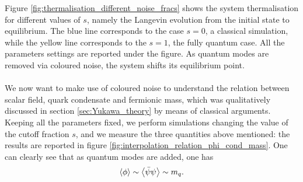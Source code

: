 Figure \ref{fig:thermalisation_different_noise_fracs} shows the system thermalisation for different values of $s$, namely the Langevin evolution from the initial state to equilibrium. The blue line corresponds to the case $s=0$, a classical simulation, while the yellow line corresponds to the $s=1$, the fully quantum case.  All the parameters settings are reported under the figure. As quantum modes are removed via coloured noise, the system shifts its equilibrium point. \\~\\ 
We now want to make use of coloured noise to understand the relation between scalar field, quark condensate and fermionic mass, which was qualitatively discussed in section \ref{sec:Yukawa_theory} by means of classical arguments. \\
Keeping all the parameters fixed, we perform simulations changing the value of the cutoff fraction $s$, and we measure the three quantities above mentioned: the results are reported in figure \ref{fig:interpolation_relation_phi_cond_mass}. 
One can clearly see that as quantum modes are added, one has
\begin{equation*}
	\left\langle \phi \right\rangle \sim \left\langle \bar\psi\psi \right\rangle \sim m_q.
\end{equation*}
